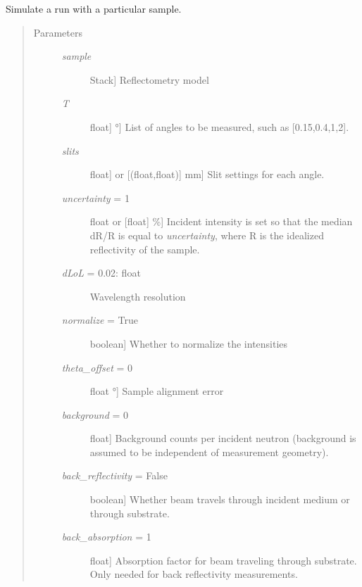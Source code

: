 \documentclass[letterpaper,10pt,english]{sphinxmanual}
\begin{document}
\begin{fulllineitems}

\begin{fulllineitems}
\label{api/snsdata:refl1d.snsdata.Magnetic.simulate}
Simulate a run with a particular sample.
\begin{quote}\begin{description}
\item[{Parameters }] \leavevmode\begin{description}
\item[{\emph{sample}}] \leavevmode{[}Stack{]}
Reflectometry model

\item[{\emph{T}}] \leavevmode{[}{[}float{]} \textbar{} °{]}
List of angles to be measured, such as {[}0.15,0.4,1,2{]}.

\item[{\emph{slits}}] \leavevmode{[}{[}float{]} or {[}(float,float){]} \textbar{} mm{]}
Slit settings for each angle.

\item[{\emph{uncertainty} = 1}] \leavevmode{[}float or {[}float{]} \textbar{} \%{]}
Incident intensity is set so that the median dR/R is equal
to \emph{uncertainty}, where R is the idealized reflectivity
of the sample.

\item[{\emph{dLoL} = 0.02: float}] \leavevmode
Wavelength resolution

\item[{\emph{normalize} = True}] \leavevmode{[}boolean{]}
Whether to normalize the intensities

\item[{\emph{theta\_offset} = 0}] \leavevmode{[}float \textbar{} °{]}
Sample alignment error

\item[{\emph{background} = 0}] \leavevmode{[}float{]}
Background counts per incident neutron (background is
assumed to be independent of measurement geometry).

\item[{\emph{back\_reflectivity} = False}] \leavevmode{[}boolean{]}
Whether beam travels through incident medium
or through substrate.

\item[{\emph{back\_absorption} = 1}] \leavevmode{[}float{]}
Absorption factor for beam traveling through substrate.
Only needed for back reflectivity measurements.

\end{description}

\end{description}\end{quote}

\end{fulllineitems}


\end{fulllineitems}
\end{document}
